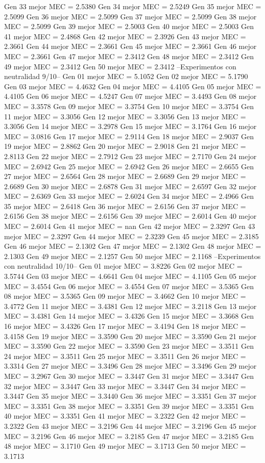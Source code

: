Gen 33 mejor MEC = 2.5380
Gen 34 mejor MEC = 2.5249
Gen 35 mejor MEC = 2.5099
Gen 36 mejor MEC = 2.5099
Gen 37 mejor MEC = 2.5099
Gen 38 mejor MEC = 2.5099
Gen 39 mejor MEC = 2.5003
Gen 40 mejor MEC = 2.5003
Gen 41 mejor MEC = 2.4868
Gen 42 mejor MEC = 2.3926
Gen 43 mejor MEC = 2.3661
Gen 44 mejor MEC = 2.3661
Gen 45 mejor MEC = 2.3661
Gen 46 mejor MEC = 2.3661
Gen 47 mejor MEC = 2.3412
Gen 48 mejor MEC = 2.3412
Gen 49 mejor MEC = 2.3412
Gen 50 mejor MEC = 2.3412
--Experimentos con neutralidad 9/10--
Gen 01 mejor MEC = 5.1052
Gen 02 mejor MEC = 5.1790
Gen 03 mejor MEC = 4.4632
Gen 04 mejor MEC = 4.4105
Gen 05 mejor MEC = 4.4105
Gen 06 mejor MEC = 4.5247
Gen 07 mejor MEC = 3.4493
Gen 08 mejor MEC = 3.3578
Gen 09 mejor MEC = 3.3754
Gen 10 mejor MEC = 3.3754
Gen 11 mejor MEC = 3.3056
Gen 12 mejor MEC = 3.3056
Gen 13 mejor MEC = 3.3056
Gen 14 mejor MEC = 3.2978
Gen 15 mejor MEC = 3.1764
Gen 16 mejor MEC = 3.0816
Gen 17 mejor MEC = 2.9114
Gen 18 mejor MEC = 2.9037
Gen 19 mejor MEC = 2.8862
Gen 20 mejor MEC = 2.9018
Gen 21 mejor MEC = 2.8113
Gen 22 mejor MEC = 2.7912
Gen 23 mejor MEC = 2.7170
Gen 24 mejor MEC = 2.6942
Gen 25 mejor MEC = 2.6942
Gen 26 mejor MEC = 2.6655
Gen 27 mejor MEC = 2.6564
Gen 28 mejor MEC = 2.6689
Gen 29 mejor MEC = 2.6689
Gen 30 mejor MEC = 2.6878
Gen 31 mejor MEC = 2.6597
Gen 32 mejor MEC = 2.6369
Gen 33 mejor MEC = 2.6024
Gen 34 mejor MEC = 2.4966
Gen 35 mejor MEC = 2.6418
Gen 36 mejor MEC = 2.6156
Gen 37 mejor MEC = 2.6156
Gen 38 mejor MEC = 2.6156
Gen 39 mejor MEC = 2.6014
Gen 40 mejor MEC = 2.6014
Gen 41 mejor MEC = nan
Gen 42 mejor MEC = 2.3297
Gen 43 mejor MEC = 2.3297
Gen 44 mejor MEC = 2.3239
Gen 45 mejor MEC = 2.3185
Gen 46 mejor MEC = 2.1302
Gen 47 mejor MEC = 2.1302
Gen 48 mejor MEC = 2.1303
Gen 49 mejor MEC = 2.1257
Gen 50 mejor MEC = 2.1168
--Experimentos con neutralidad 10/10--
Gen 01 mejor MEC = 3.8226
Gen 02 mejor MEC = 3.5744
Gen 03 mejor MEC = 4.6641
Gen 04 mejor MEC = 4.1105
Gen 05 mejor MEC = 3.4554
Gen 06 mejor MEC = 3.4554
Gen 07 mejor MEC = 3.5365
Gen 08 mejor MEC = 3.5365
Gen 09 mejor MEC = 3.4662
Gen 10 mejor MEC = 3.4772
Gen 11 mejor MEC = 3.4381
Gen 12 mejor MEC = 3.2118
Gen 13 mejor MEC = 3.4381
Gen 14 mejor MEC = 3.4326
Gen 15 mejor MEC = 3.3668
Gen 16 mejor MEC = 3.4326
Gen 17 mejor MEC = 3.4194
Gen 18 mejor MEC = 3.4158
Gen 19 mejor MEC = 3.3590
Gen 20 mejor MEC = 3.3590
Gen 21 mejor MEC = 3.3590
Gen 22 mejor MEC = 3.3590
Gen 23 mejor MEC = 3.3511
Gen 24 mejor MEC = 3.3511
Gen 25 mejor MEC = 3.3511
Gen 26 mejor MEC = 3.3314
Gen 27 mejor MEC = 3.3496
Gen 28 mejor MEC = 3.3496
Gen 29 mejor MEC = 3.2967
Gen 30 mejor MEC = 3.3447
Gen 31 mejor MEC = 3.3447
Gen 32 mejor MEC = 3.3447
Gen 33 mejor MEC = 3.3447
Gen 34 mejor MEC = 3.3447
Gen 35 mejor MEC = 3.3440
Gen 36 mejor MEC = 3.3351
Gen 37 mejor MEC = 3.3351
Gen 38 mejor MEC = 3.3351
Gen 39 mejor MEC = 3.3351
Gen 40 mejor MEC = 3.3351
Gen 41 mejor MEC = 3.2322
Gen 42 mejor MEC = 3.2322
Gen 43 mejor MEC = 3.2196
Gen 44 mejor MEC = 3.2196
Gen 45 mejor MEC = 3.2196
Gen 46 mejor MEC = 3.2185
Gen 47 mejor MEC = 3.2185
Gen 48 mejor MEC = 3.1710
Gen 49 mejor MEC = 3.1713
Gen 50 mejor MEC = 3.1713
